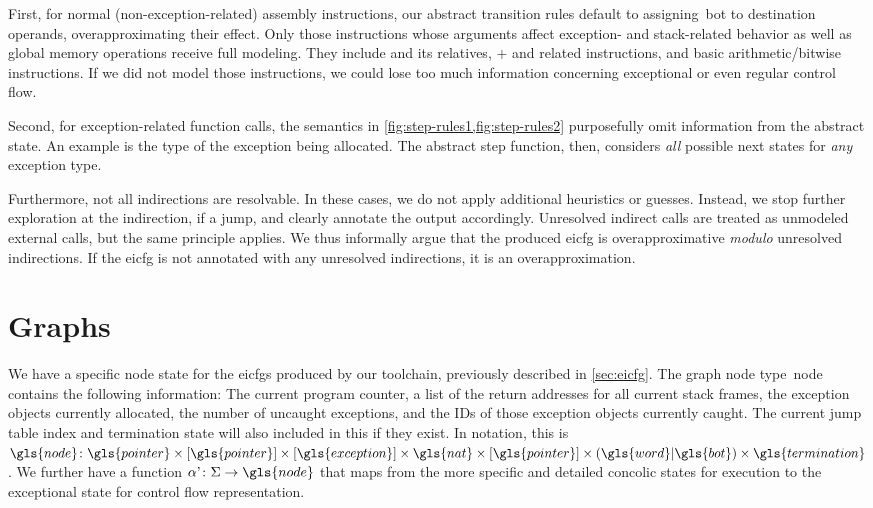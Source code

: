First, for normal (non-exception-related) assembly instructions, our abstract transition rules default to assigning~\gls{bot} to destination operands, overapproximating their effect.
Only those instructions whose arguments affect exception- and stack-related behavior as well as global memory operations receive full modeling.
They include  and its relatives, + and related instructions, and basic arithmetic/bitwise instructions.
If we did not model those instructions, we could lose too much information concerning exceptional or even regular control flow.

Second, for exception-related function calls, the semantics in \cref{fig:step-rules1,fig:step-rules2} purposefully omit information from the abstract state.
An example is the type of the exception being allocated.
The abstract step function, then, considers \emph{all} possible next states for \emph{any} exception type.

Furthermore, not all indirections are resolvable.
In these cases, we do not apply additional heuristics or guesses.
Instead, we stop further exploration at the indirection, if a jump, and clearly annotate the output accordingly.
Unresolved indirect calls are treated as unmodeled external calls, but the same principle applies.
We thus informally argue that the produced \ac{eicfg} is overapproximative \emph{modulo} unresolved indirections.
If the \ac{eicfg} is not annotated with any unresolved indirections, it is an overapproximation. %

\section{Graphs}
We have a specific node state for the \acp{eicfg} produced by our toolchain,
previously described in \cref{sec:eicfg}.
The graph node type~\gls{node} contains the following information:
The current program counter,
a list of the return addresses for all current stack frames,
the exception objects currently allocated,
the number of uncaught exceptions,
and the IDs of those exception objects currently caught.
The current jump table index and termination state will also included in this if they exist. In notation, this is
$\gls{node}\colon\gls{pointer}\times[\gls{pointer}]\times[\gls{exception}]\times\gls{nat}\times[\gls{pointer}]\times(\gls{word}|\gls{bot})\times\gls{termination}$.
We further have a function $\stateToNode\colon\Sigma\rightarrow\gls{node}$
that maps from the more specific and detailed concolic states for execution
to the exceptional state for control flow representation.


